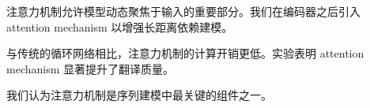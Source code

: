 注意力机制允许模型动态聚焦于输入的重要部分。我们在编码器之后引入 attention mechanism 以增强长距离依赖建模。

与传统的循环网络相比，注意力机制的计算开销更低。实验表明 attention mechanism 显著提升了翻译质量。

我们认为注意力机制是序列建模中最关键的组件之一。
